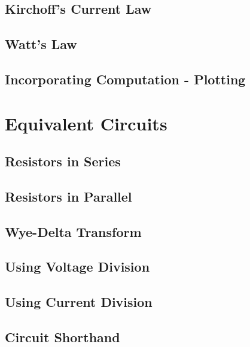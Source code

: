 \documentclass[a4paper,11pt]{book}
\begin{document}
\section{Kirchoff's Current Law}

\section{Watt's Law}

\section{Incorporating Computation - Plotting}
\chapter{Equivalent Circuits}

\section{Resistors in Series}

\section{Resistors in Parallel}


%

\section{Wye-Delta Transform}
%
\section{Using Voltage Division}

\section{Using Current Division}

\section{Circuit Shorthand}

\end{document}
